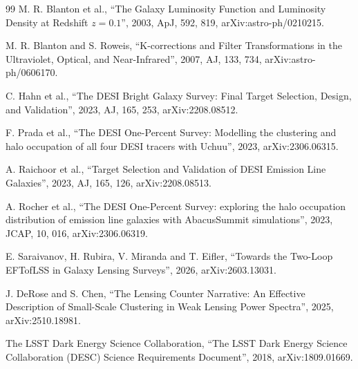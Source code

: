 \documentclass[11pt]{article}
\begin{document}
\begin{thebibliography}{99}
M. R. Blanton et al.,
``The Galaxy Luminosity Function and Luminosity Density at Redshift
$z = 0.1$'',
2003, ApJ, 592, 819,
arXiv:astro-ph/0210215.

M. R. Blanton and S. Roweis,
``K-corrections and Filter Transformations in the Ultraviolet,
Optical, and Near-Infrared'',
2007, AJ, 133, 734,
arXiv:astro-ph/0606170.

C. Hahn et al.,
``The DESI Bright Galaxy Survey: Final Target Selection, Design, and
Validation'',
2023, AJ, 165, 253,
arXiv:2208.08512.

F. Prada et al.,
``The DESI One-Percent Survey: Modelling the clustering and halo
occupation of all four DESI tracers with Uchuu'',
2023, arXiv:2306.06315.

A. Raichoor et al.,
``Target Selection and Validation of DESI Emission Line Galaxies'',
2023, AJ, 165, 126,
arXiv:2208.08513.

A. Rocher et al.,
``The DESI One-Percent Survey: exploring the halo occupation
distribution of emission line galaxies with AbacusSummit
simulations'',
2023, JCAP, 10, 016,
arXiv:2306.06319.

E. Saraivanov, H. Rubira, V. Miranda and T. Eifler,
``Towards the Two-Loop EFTofLSS in Galaxy Lensing Surveys'',
2026, arXiv:2603.13031.

J. DeRose and S. Chen,
``The Lensing Counter Narrative: An Effective Description of
Small-Scale Clustering in Weak Lensing Power Spectra'',
2025, arXiv:2510.18981.

The LSST Dark Energy Science Collaboration,
``The LSST Dark Energy Science Collaboration (DESC) Science
Requirements Document'',
2018, arXiv:1809.01669.

\end{thebibliography}
\end{document}
